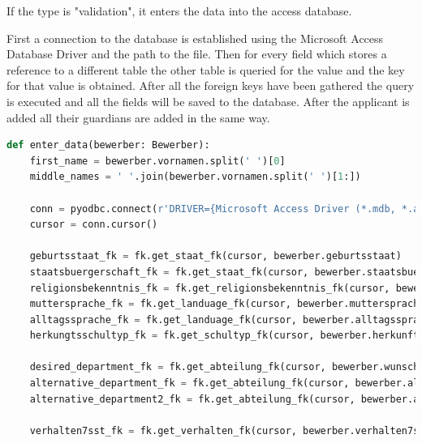 If the type is "validation", it enters the data into the access database.

First a connection to the database is established using the Microsoft Access Database Driver and the path to the file. Then for every field which stores a reference to a different table the other table is queried for the value and the key for that value is obtained. After all the foreign keys have been gathered the query is executed and all the fields will be saved to the database.
After the applicant is added all their guardians are added in the same way.

\begin{lstlisting}[language=Python,caption=Code for entering the data into the Access database]
def enter_data(bewerber: Bewerber):
    first_name = bewerber.vornamen.split(' ')[0]
    middle_names = ' '.join(bewerber.vornamen.split(' ')[1:])

    conn = pyodbc.connect(r'DRIVER={Microsoft Access Driver (*.mdb, *.accdb)};DBQ=C:\Users\domio\OneDrive\Diplomarbeit\Webservice\bewerber2023leer.accdb;')
    cursor = conn.cursor()

    geburtsstaat_fk = fk.get_staat_fk(cursor, bewerber.geburtsstaat)
    staatsbuergerschaft_fk = fk.get_staat_fk(cursor, bewerber.staatsbuergerschaft)
    religionsbekenntnis_fk = fk.get_religionsbekenntnis_fk(cursor, bewerber.religion)
    muttersprache_fk = fk.get_landuage_fk(cursor, bewerber.muttersprache)
    alltagssprache_fk = fk.get_landuage_fk(cursor, bewerber.alltagssprache)
    herkungtsschultyp_fk = fk.get_schultyp_fk(cursor, bewerber.herkunftsschule_typ)

    desired_department_fk = fk.get_abteilung_fk(cursor, bewerber.wunsch_abteilung)
    alternative_department_fk = fk.get_abteilung_fk(cursor, bewerber.alternativ_abteilung)
    alternative_department2_fk = fk.get_abteilung_fk(cursor, bewerber.alternativ_abteilung2)

    verhalten7sst_fk = fk.get_verhalten_fk(cursor, bewerber.verhalten7sst)


\end{lstlisting}
